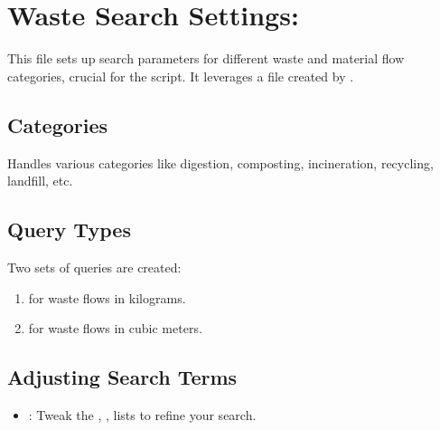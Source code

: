 \documentclass[letterpaper,10pt,english]{sphinxmanual}
\begin{document}
\section{Waste Search Settings: }
\label{\detokenize{configuration:waste-search-settings-queries-waste-py}}
\sphinxAtStartPar
This file sets up search parameters for different waste and material flow categories, crucial for the  script. It leverages a  file created by .


\subsection{Categories}
\label{\detokenize{configuration:categories}}
\sphinxAtStartPar
Handles various categories like digestion, composting, incineration, recycling, landfill, etc.


\subsection{Query Types}
\label{\detokenize{configuration:query-types}}
\sphinxAtStartPar
Two sets of queries are created:
\begin{enumerate}
%
\item {} 
\sphinxAtStartPar
{} for waste flows in kilograms.

\item {} 
\sphinxAtStartPar
{} for waste flows in cubic meters.

\end{enumerate}


\subsection{Adjusting Search Terms}
\label{\detokenize{configuration:adjusting-search-terms}}\begin{itemize}
\item {} 
\sphinxAtStartPar
{}: Tweak the , ,  lists to refine your search.

\end{itemize}
\end{document}
